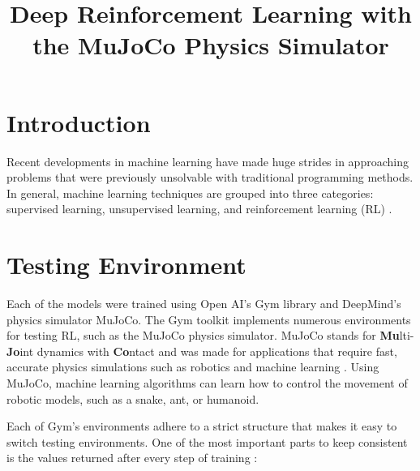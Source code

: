 \documentclass[conference]{IEEEtran}
\begin{document}
\title{Deep Reinforcement Learning with the MuJoCo Physics Simulator}

\author{
    \and
}
\maketitle

\begin{abstract}
    \blindtext
\end{abstract}

\section{Introduction}

Recent developments in machine learning have made huge strides in approaching problems that were previously unsolvable
with traditional programming methods. In general, machine learning techniques are grouped into three categories:
supervised learning, unsupervised learning, and reinforcement learning (RL) \cite{rl_application}.

\blindtext
\blinditemize[4]

\blindtext

\section{Testing Environment}

Each of the models were trained using Open AI's Gym library and DeepMind's physics simulator MuJoCo. The Gym toolkit
implements numerous environments for testing RL, such as the MuJoCo physics simulator. MuJoCo stands
for {\bf Mu}lti-{\bf Jo}int dynamics with {\bf Co}ntact and was made for applications that require fast, accurate
physics simulations such as robotics and machine learning \cite{mujoco_docs}. Using MuJoCo, machine learning
algorithms can learn how to control the movement of robotic models, such as a snake, ant, or humanoid.

Each of Gym's environments adhere to a strict structure that makes it easy to switch testing environments. One of the
most important parts to keep consistent is the values returned after every step of training \cite{gym_docs}:
\end{document}
